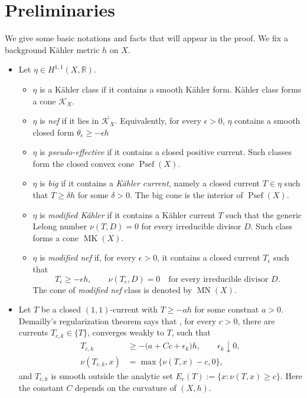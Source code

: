 \documentclass[reqno]{amsart}
\theoremstyle{remark}
\def\R{\mathbb{R}}
\newcommand{\Psef}{\operatorname{Psef}}
\newcommand{\MN}{\operatorname{MN}}
\newcommand{\MK}{\operatorname{MK}}
\def\cK{{\mathcal K}}
\theoremstyle{plain}
\begin{document}
\section{Preliminaries}
We give some basic notations and facts that will appear in the proof. We fix a background K\"ahler metric $h$ on $X$.  \begin{itemize}
    \item Let $\eta\in H^{1,1}(X,\R)$. \begin{itemize}
        \item $\eta$ is a K\"ahler class if it contains a smooth K\"ahler form. K\"ahler class forms a cone $\cK_X$.
        \item $\eta$ is \emph{nef} if it lies in $\overline{\cK_X}$. Equivalently, for every $\epsilon>0$, $\eta$ contains a smooth closed form $\theta_\epsilon\geq -\epsilon h$
        \item $\eta$ is \emph{pseudo-effective} if it contains a closed positive
        current.  Such classes form the closed convex cone
        $\Psef(X)$.
        \item $\eta$ is \emph{big} if it contains a \emph{K\"ahler current},
        namely a closed current $T\in\eta$ such that
      $T\geq\delta h$ for some $\delta>0$.  The big cone is the
      interior of $\Psef(X)$.
      \item $\eta$ is \emph{modified K\"ahler} if it contains a K\"ahler current $T$
      such that the generic Lelong number $\nu(T,D)=0$ for every irreducible divisor $D$. Such class forms a cone $\MK(X)$.
\item $\eta$ is \emph{modified nef} if, for every $\epsilon>0$, it contains a
      closed current $T_\epsilon$ such that
      \[
        T_\epsilon\geq-\epsilon h,
        \qquad \nu(T_\epsilon,D)=0
        \quad\text{for every irreducible divisor }D.
      \]The cone of \emph{modified nef} class is denoted by $\MN(X)$.
    \end{itemize}
 \item Let $T$ be a closed $(1,1)$-current with $T\geq -ah$ for some constnat $a>0$. Demailly's regularization theorem \cite{D92} says that , for every $c>0$, there are currents $T_{c,k}\in \{T\}$, converges weakly to $T$, such that \begin{align*}
 T_{c,k}&\geq-\bigl(a+C c+\epsilon_k\bigr)h,
       \qquad \epsilon_k\downarrow0,\\
 \nu(T_{c,k},x)&=\max\{\nu(T,x)-c,0\},
\end{align*}
and $T_{c,k}$ is smooth outside the analytic set $
 E_c(T):=\{x:\nu(T,x)\geq c\}$. Here the constant $C$ depends  on the curvature of $(X,h)$.


\end{itemize}
\end{document}
